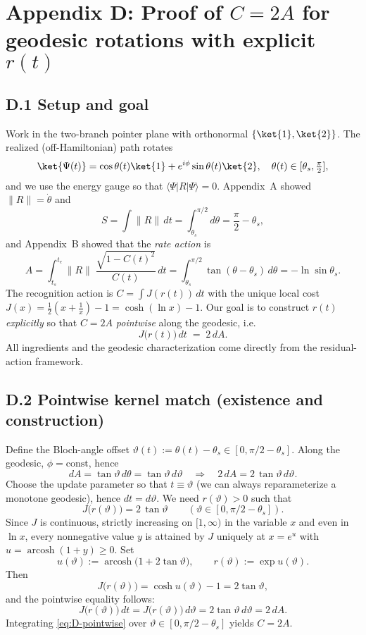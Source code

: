 \documentclass[11pt,letterpaper]{article}
\theoremstyle{definition}
\begin{document}
\section*{Appendix D: Proof of \texorpdfstring{$C=2A$}{C=2A} for geodesic rotations with explicit \(r(t)\)}

\subsection*{D.1 Setup and goal}

Work in the two-branch pointer plane with orthonormal \(\{\ket{1},\ket{2}\}\). The realized (off-Hamiltonian) path rotates
\[
\ket{\Psi(t)}=\cos\theta(t)\ket{1}+e^{i\phi}\sin\theta(t)\ket{2},
\quad \theta(t)\in[\theta_s,\tfrac{\pi}{2}],
\]
and we use the energy gauge so that \(\langle\Psi|R|\Psi\rangle=0\). Appendix~A showed \(\|R\|=\dot\theta\) and
\[
S=\int\!\|R\|\,dt=\int_{\theta_s}^{\pi/2}\!d\theta=\frac{\pi}{2}-\theta_s,
\]
and Appendix~B showed that the \emph{rate action} is
\[
A=\int_{t_s}^{t_e}\!\|R\|\;\frac{\sqrt{1-C(t)^2}}{C(t)}\,dt
= \int_{\theta_s}^{\pi/2}\!\tan(\theta-\theta_s)\,d\theta
= -\ln\sin\theta_s.
\]
The recognition action is \(C=\int J(r(t))\,dt\) with the unique local cost \(J(x)=\tfrac12(x+\tfrac1x)-1=\cosh(\ln x)-1\).
Our goal is to construct \(r(t)\) \emph{explicitly} so that \(C=2A\) \emph{pointwise} along the geodesic, i.e.
\[
J\!\bigl(r(t)\bigr)\,dt\;=\;2\,dA.
\]
All ingredients and the geodesic characterization come directly from the residual-action framework.
\subsection*{D.2 Pointwise kernel match (existence and construction)}

Define the Bloch-angle offset \(\vartheta(t):=\theta(t)-\theta_s\in[0,\pi/2-\theta_s]\). Along the geodesic, \(\phi=\mathrm{const}\), hence
\[
dA=\tan\vartheta\,d\theta=\tan\vartheta\,d\vartheta
\quad\Rightarrow\quad
2\,dA=2\,\tan\vartheta\,d\vartheta.
\]
Choose the update parameter so that \(t\equiv\vartheta\) (we can always reparameterize a monotone geodesic), hence \(dt=d\vartheta\). We need \(r(\vartheta)>0\) such that
\[
J\!\bigl(r(\vartheta)\bigr)=2\,\tan\vartheta\qquad(\vartheta\in[0,\pi/2-\theta_s]).
\]
Since \(J\) is continuous, strictly increasing on \([1,\infty)\) in the variable \(x\) and even in \(\ln x\), every nonnegative value \(y\) is attained by \(J\) uniquely at \(x=e^{u}\) with \(u=\operatorname{arcosh}(1+y)\ge 0\). Set
\begin{equation}
u(\vartheta):=\operatorname{arcosh}\!\bigl(1+2\tan\vartheta\bigr),\qquad
r(\vartheta):=\exp u(\vartheta).
\label{eq:D-r-profile}
\end{equation}
Then
\[
J\!\bigl(r(\vartheta)\bigr)=\cosh u(\vartheta)-1=2\tan\vartheta,
\]
and the pointwise equality follows:
\begin{equation}
J\!\bigl(r(\vartheta)\bigr)\,dt
=
J\!\bigl(r(\vartheta)\bigr)\,d\vartheta
=
2\tan\vartheta\,d\vartheta
=
2\,dA.
\label{eq:D-pointwise}
\end{equation}
Integrating \eqref{eq:D-pointwise} over \(\vartheta\in[0,\pi/2-\theta_s]\) yields \(C=2A\).
\end{document}
